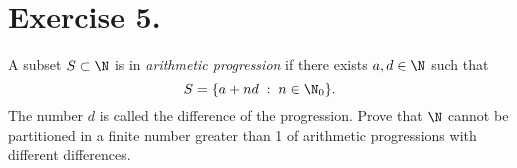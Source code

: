 \section*{Exercise 5.}

A subset $S\subset \N$ is in \textit{arithmetic progression} if there exists $a,d\in\N$ such that
\[ S = \{a+nd \;:\; n\in\N_0\}. \]
The number $d$ is called the difference of the progression. Prove that $\N$ cannot be partitioned in a finite number greater than 1 of arithmetic progressions with different differences.